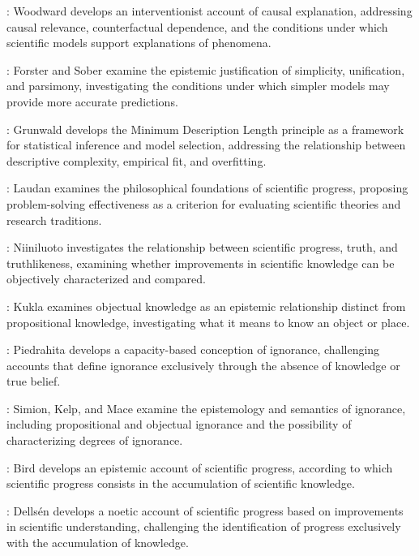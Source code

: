 
\cite{woodward2003making}: Woodward develops an interventionist account of causal explanation, addressing causal relevance, counterfactual dependence, and the conditions under which scientific models support explanations of phenomena.


\cite{forster1994simpler}: Forster and Sober examine the epistemic justification of simplicity, unification, and parsimony, investigating the conditions under which simpler models may provide more accurate predictions.


\cite{grunwald2007minimum}: Grunwald develops the Minimum Description Length principle as a framework for statistical inference and model selection, addressing the relationship between descriptive complexity, empirical fit, and overfitting.


\cite{laudan1977progress}: Laudan examines the philosophical foundations of scientific progress, proposing problem-solving effectiveness as a criterion for evaluating scientific theories and research traditions.


\cite{niiniluoto1984science}: Niiniluoto investigates the relationship between scientific progress, truth, and truthlikeness, examining whether improvements in scientific knowledge can be objectively characterized and compared.


\cite{kukla2023knowing}: Kukla examines objectual knowledge as an epistemic relationship distinct from propositional knowledge, investigating what it means to know an object or place.

\cite{piedrahita2025capacity}: Piedrahita develops a capacity-based conception of ignorance, challenging accounts that define ignorance exclusively through the absence of knowledge or true belief.

\cite{simion2026ignorance}: Simion, Kelp, and Mace examine the epistemology and semantics of ignorance, including propositional and objectual ignorance and the possibility of characterizing degrees of ignorance.

\cite{bird2007progress}: Bird develops an epistemic account of scientific progress, according to which scientific progress consists in the accumulation of scientific knowledge.

\cite{dellsen2016progress}: Dellsén develops a noetic account of scientific progress based on improvements in scientific understanding, challenging the identification of progress exclusively with the accumulation of knowledge.
